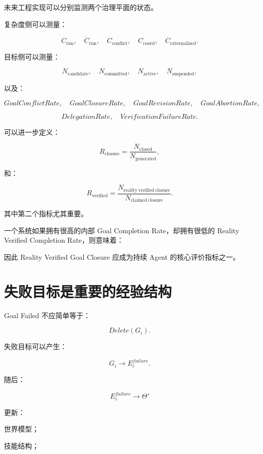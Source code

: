 未来工程实现可以分别监测两个治理平面的状态。

复杂度侧可以测量：

\[
C_{\mathrm{run}},
\quad
\dot C_{\mathrm{run}},
\quad
C_{\mathrm{conflict}},
\quad
C_{\mathrm{coord}},
\quad
C_{\mathrm{externalized}}.
\]

目标侧可以测量：

\[
N_{\mathrm{candidate}},
\quad
N_{\mathrm{committed}},
\quad
N_{\mathrm{active}},
\quad
N_{\mathrm{suspended}},
\]

以及：

\[
GoalConflictRate,
\quad
GoalClosureRate,
\quad
GoalRevisionRate,
\quad
GoalAbortionRate,
\]

\[
DelegationRate,
\quad
VerificationFailureRate.
\]

可以进一步定义：

\[
R_{\mathrm{closure}}
=
\frac{
N_{\mathrm{closed}}
}{
N_{\mathrm{generated}}
},
\]

和：

\[
R_{\mathrm{verified}}
=
\frac{
N_{\mathrm{reality\ verified\ closure}}
}{
N_{\mathrm{claimed\ closure}}
}.
\]

其中第二个指标尤其重要。

一个系统如果拥有很高的内部 Goal Completion Rate，却拥有很低的 Reality Verified Completion Rate，则意味着：

\begin{statementbox}
\centering
{}
\end{statementbox}

因此 Reality Verified Goal Closure 应成为持续 Agent 的核心评价指标之一。


\section{失败目标是重要的经验结构}

Goal Failed 不应简单等于：

\[
Delete(G_i).
\]

失败目标可以产生：

\[
G_i
\rightarrow
E_i^{failure}.
\]

随后：

\[
E_i^{failure}
\rightarrow
\Theta'
\]

更新：

世界模型；

技能结构；

